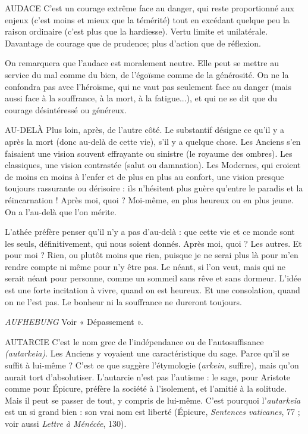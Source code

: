 AUDACE C'est un courage extrême face au danger, qui reste proportionné
aux enjeux (c’est moins et mieux que la témérité) tout en excédant
quelque peu la raison ordinaire (c’est plus que la hardiesse). Vertu limite et unilatérale.
Davantage de courage que de prudence; plus d’action que de
réflexion.

On remarquera que l’audace est moralement neutre. Elle peut se mettre au
service du mal comme du bien, de l’égoïsme comme de la générosité. On ne la
confondra pas avec l’héroïsme, qui ne vaut pas seulement face au danger (mais
aussi face à la souffrance, à la mort, à la fatigue...), et qui ne se dit que du courage
désintéressé ou généreux.

AU-DELÀ Plus loin, après, de l’autre côté. Le substantif désigne ce qu’il y a
après la mort (donc au-delà de cette vie), s’il y a quelque chose.
Les Anciens s’en faisaient une vision souvent effrayante ou sinistre (le royaume
des ombres). Les classiques, une vision contrastée (salut ou damnation). Les
Modernes, qui croient de moins en moins à l’enfer et de plus en plus au
confort, une vision presque toujours rassurante ou dérisoire : ils n’hésitent plus
guère qu'entre le paradis et la réincarnation ! Après moi, quoi ? Moi-même, en
plus heureux ou en plus jeune. On a l'au-delà que l’on mérite.

L’athée préfère penser qu’il n’y a pas d’au-delà : que cette vie et ce monde
sont les seuls, définitivement, qui nous soient donnés. Après moi, quoi ? Les
autres. Et pour moi ? Rien, ou plutôt moins que rien, puisque je ne serai plus
là pour m’en rendre compte ni même pour n’y être pas. Le néant, si l’on veut,
mais qui ne serait néant pour personne, comme un sommeil sans rêve et sans
dormeur. L'idée est une forte incitation à vivre, quand on est heureux. Et une
consolation, quand on ne l’est pas. Le bonheur ni la souffrance ne dureront
toujours.

{\it AUFHEBUNG} Voir « Dépassement ».

AUTARCIE C'est le nom grec de l’indépendance ou de l’autosuffisance {\it (autarkeia)}.
Les Anciens y voyaient une caractéristique du sage. Parce
qu’il se suffit à lui-même ? C’est ce que suggère l’étymologie ({\it arkein}, suffire),
mais qu’on aurait tort d’absolutiser. L’autarcie n’est pas l’autisme : le sage, pour
Aristote comme pour Épicure, préfère la société à l’isolement, et l’amitié à la
solitude. Mais il peut se passer de tout, y compris de lui-même. C’est pourquoi
l’{\it autarkeia} est un si grand bien : son vrai nom est liberté (Épicure, {\it Sentences
vaticanes}, 77 ; voir aussi {\it Lettre à Ménécée}, 130).

